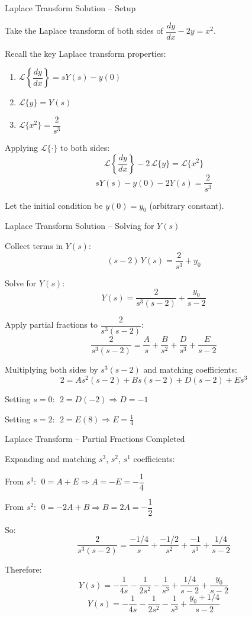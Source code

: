 \documentclass{beamer}
\numberwithin{equation}{section}
\theoremstyle{remark}
\begin{document}
\begin{frame}{Laplace Transform Solution -- Setup}

Take the Laplace transform of both sides of $\dfrac{dy}{dx} - 2y = x^2$.

Recall the key Laplace transform properties:
\begin{enumerate}
  \item $\mathcal{L}\!\left\{\dfrac{dy}{dx}\right\} = sY(s) - y(0)$
  \item $\mathcal{L}\{y\} = Y(s)$
  \item $\mathcal{L}\{x^2\} = \dfrac{2}{s^3}$
\end{enumerate}

Applying $\mathcal{L}\{\cdot\}$ to both sides:
\[
  \mathcal{L}\!\left\{\frac{dy}{dx}\right\} - 2\,\mathcal{L}\{y\} = \mathcal{L}\{x^2\}
\]
\[
  sY(s) - y(0) - 2Y(s) = \frac{2}{s^3}
\]

Let the initial condition be $y(0) = y_0$ (arbitrary constant).

\end{frame}

\begin{frame}{Laplace Transform Solution -- Solving for $Y(s)$}

Collect terms in $Y(s)$:
\[
  (s - 2)\,Y(s) = \frac{2}{s^3} + y_0
\]

Solve for $Y(s)$:
\[
  Y(s) = \frac{2}{s^3(s-2)} + \frac{y_0}{s-2}
\]

Apply partial fractions to $\dfrac{2}{s^3(s-2)}$:
\[
  \frac{2}{s^3(s-2)}
  = \frac{A}{s} + \frac{B}{s^2} + \frac{D}{s^3} + \frac{E}{s-2}
\]

Multiplying both sides by $s^3(s-2)$ and matching coefficients:
\[
  2 = As^2(s-2) + Bs(s-2) + D(s-2) + Es^3
\]

Setting $s=0$: $\;2 = D(-2) \Rightarrow D = -1$

Setting $s=2$: $\;2 = E(8) \Rightarrow E = \frac{1}{4}$

\end{frame}

\begin{frame}{Laplace Transform -- Partial Fractions Completed}

Expanding and matching $s^3$, $s^2$, $s^1$ coefficients:

From $s^3$: $\;0 = A + E \Rightarrow A = -E = -\dfrac{1}{4}$

From $s^2$: $\;0 = -2A + B \Rightarrow B = 2A = -\dfrac{1}{2}$

So:
\[
  \frac{2}{s^3(s-2)}
  = \frac{-1/4}{s} + \frac{-1/2}{s^2} + \frac{-1}{s^3} + \frac{1/4}{s-2}
\]

Therefore:
\[
  Y(s) = -\frac{1}{4s} - \frac{1}{2s^2} - \frac{1}{s^3}
         + \frac{1/4}{s-2} + \frac{y_0}{s-2}
\]
\[
  Y(s) = -\frac{1}{4s} - \frac{1}{2s^2} - \frac{1}{s^3}
         + \frac{y_0 + 1/4}{s-2}
\]

\end{frame}
\end{document}
